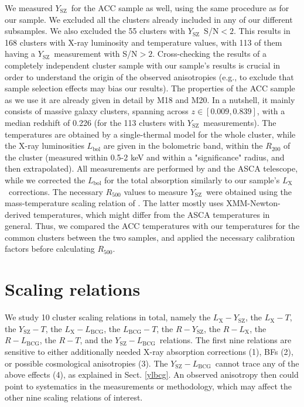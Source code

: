 \documentclass{aa}   %
\newcommand{\LT}{$L_{\text{X}}-T$}
\newcommand{\YT}{$Y_{\text{SZ}}-T$}
\newcommand{\LbcgT}{$L_{\text{BCG}}-T$}
\newcommand{\LY}{$L_{\text{X}}-Y_{\text{SZ}}$}
\newcommand{\LxLbcg}{$L_{\text{X}}-L_{\text{BCG}}$}
\newcommand{\YLbcg}{$Y_{\text{SZ}}-L_{\text{BCG}}$}
\newcommand{\RL}{$R-L_{\text{X}}$}
\newcommand{\RY}{$R-Y_{\text{SZ}}$}
\newcommand{\RLbcg}{$R-L_{\text{BCG}}$}
\newcommand{\RT}{$R-T$}
\newcommand{\Lx}{$L_{\text{X}}$}
\newcommand{\Ysz}{$Y_{\text{SZ}}$}
\begin{document}
We measured \Ysz\ for the ACC sample \citep{horner} as well, using the same procedure as for our sample. We excluded all the clusters already included in any of our different subsamples. We also excluded the 55 clusters with \Ysz\ S/N$<2$. This results in 168 clusters with X-ray luminosity and temperature values, with 113 of them having a \Ysz\ measurement with S/N$>2$. Cross-checking the results of a completely independent cluster sample with our sample's results is crucial in order to understand the origin of the observed anisotropies (e.g., to exclude that sample selection effects may bias our results). The properties of the ACC sample as we use it are already given in detail by M18 and M20. In a nutshell, it mainly consists of massive galaxy clusters, spanning across $z\in [0.009, 0.839]$, with a median redshift of 0.226 (for the 113 clusters with \Ysz\ measurements). The temperatures are obtained by a single-thermal model for the whole cluster, while the X-ray luminosities $L_{\text{bol}}$ are given in the bolometric band, within the $R_{200}$ of the cluster (measured within 0.5-2 keV and within a "significance" radius, and then extrapolated). All measurements are performed by \citet{horner} and the ASCA telescope, while we corrected the $L_{\text{bol}}$ for the total absorption similarly to our sample's \Lx\ corrections. The necessary $R_{500}$ values to measure \Ysz\ were obtained using the mass-temperature scaling relation of \citet{reichert}. The latter mostly uses XMM-Newton-derived temperatures, which might differ from the ASCA temperatures in general. Thus, we compared the ACC temperatures with our temperatures for the common clusters between the two samples, and applied the necessary calibration factors before calculating $R_{500}$. 

\section{Scaling relations}\label{sc_rel_descr}

We study 10 cluster scaling relations in total, namely the \LY,  the \LT, the \YT, the \LxLbcg,  the \LbcgT, the \RY, the \RL, the \RLbcg, the \RT, and the \YLbcg\ relations. The first nine relations are sensitive to either additionally needed X-ray absorption corrections (1), BFs (2), or possible cosmological anisotropies (3). The \YLbcg\ cannot trace any of the above effects (4), as explained in Sect. \ref{ylbcg}. An observed anisotropy then could point to systematics in the measurements or methodology, which may affect the other nine scaling relations of interest.
\end{document}
